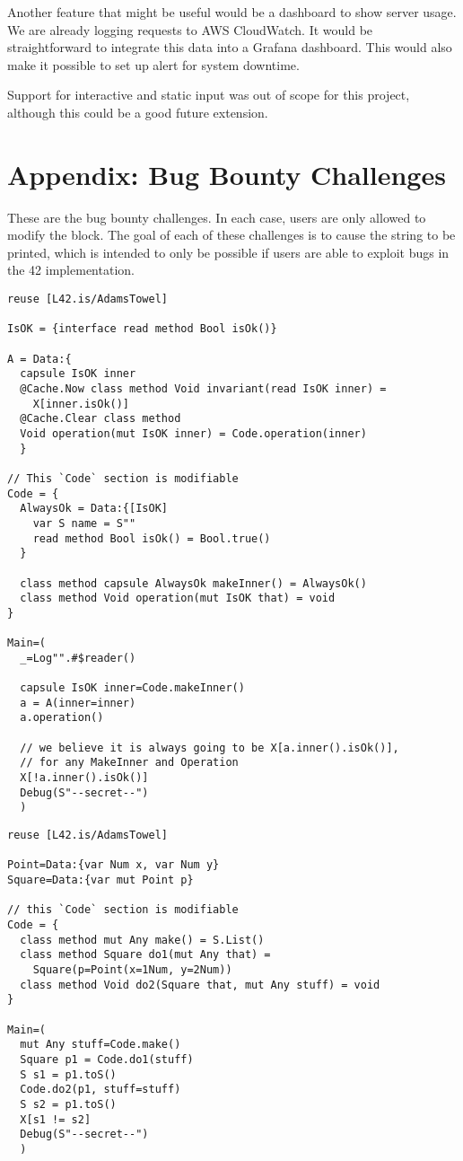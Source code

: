 Another feature that might be useful would be a dashboard to show server usage. We are already logging requests to AWS CloudWatch. It would be straightforward to integrate this data into a Grafana dashboard. This would also make it possible to set up alert for system downtime.

Support for interactive and static input was out of scope for this project, although this could be a good future extension.

\chapter{Appendix: Bug Bounty Challenges}

These are the bug bounty challenges. In each case, users are only allowed to modify the  block. The goal of each of these challenges is to cause the  string to be printed, which is intended to only be possible if users are able to exploit bugs in the 42 implementation.

\begin{lstlisting}[caption=Bug Bounty Challenge \#1]
reuse [L42.is/AdamsTowel]

IsOK = {interface read method Bool isOk()}

A = Data:{
  capsule IsOK inner
  @Cache.Now class method Void invariant(read IsOK inner) =
    X[inner.isOk()]
  @Cache.Clear class method
  Void operation(mut IsOK inner) = Code.operation(inner)
  }

// This `Code` section is modifiable
Code = {
  AlwaysOk = Data:{[IsOK]
    var S name = S""
    read method Bool isOk() = Bool.true()
  }

  class method capsule AlwaysOk makeInner() = AlwaysOk()
  class method Void operation(mut IsOK that) = void
}

Main=(
  _=Log"".#$reader()

  capsule IsOK inner=Code.makeInner()
  a = A(inner=inner)
  a.operation()

  // we believe it is always going to be X[a.inner().isOk()],
  // for any MakeInner and Operation
  X[!a.inner().isOk()]
  Debug(S"--secret--")
  )

\end{lstlisting}

\begin{lstlisting}[caption=Bug Bounty Challenge \#2]
reuse [L42.is/AdamsTowel]

Point=Data:{var Num x, var Num y}
Square=Data:{var mut Point p}

// this `Code` section is modifiable
Code = {
  class method mut Any make() = S.List()
  class method Square do1(mut Any that) =
    Square(p=Point(x=1Num, y=2Num))
  class method Void do2(Square that, mut Any stuff) = void
}

Main=(
  mut Any stuff=Code.make()
  Square p1 = Code.do1(stuff)
  S s1 = p1.toS()
  Code.do2(p1, stuff=stuff)
  S s2 = p1.toS()
  X[s1 != s2]
  Debug(S"--secret--")
  )
\end{lstlisting}

